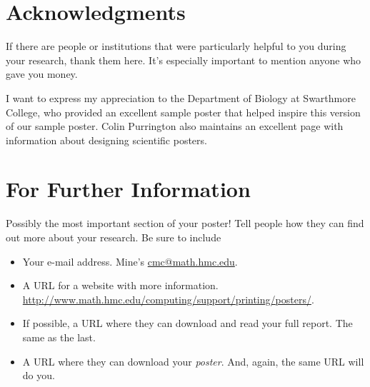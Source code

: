 \documentclass[clinic]{hmcposter}
\begin{document}
\begin{poster}
\columnbreak






\section{Acknowledgments}

If there are people or institutions that were particularly helpful
to you during your research, thank them here.  It's especially
important to mention anyone who gave you money.

I want to express my appreciation to the Department of Biology at
Swarthmore College, who provided an excellent sample poster
\citep{swarthmore-poster} that helped inspire this version of our
sample poster.  Colin Purrington also maintains an excellent page
with information about designing scientific
posters. \citeyearpar{purrington-sciposters}


\section{For Further Information}

Possibly the most important section of your poster!  Tell people
how they can find out more about your research.  Be sure to
include
\begin{itemize}
\item Your e-mail address.  Mine's \url{cmc@math.hmc.edu}.
\item A URL for a website with more information.  \url{http://www.math.hmc.edu/computing/support/printing/posters/}.
\item If possible, a URL where they can download and read your full
  report.  The same as the last.
\item A URL where they can download your \emph{poster}.  And, again,
  the same URL will do you.
\end{itemize}



\end{poster}
\end{document}

